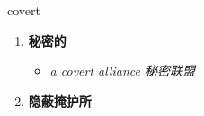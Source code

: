 
\begin{frame}
{\huge covert}
\begin{center}
\begin{enumerate}\Large
  \item \textbf{秘密的}
  \begin{itemize}
    \item \em{\Large{a covert alliance 秘密联盟}}
  \end{itemize}
  \item \textbf{隐蔽掩护所}
\end{enumerate}
\end{center}
\end{frame}

